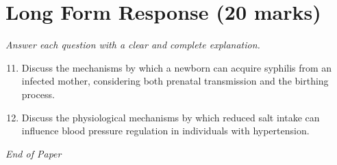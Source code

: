 \documentclass[12pt]{article}
\begin{document}
\section*{Long Form Response (20 marks)}
\textit{Answer each question with a clear and complete explanation.}
\begin{enumerate}[label=\arabic*.]
\setcounter{enumi}{10}
\item Discuss the mechanisms by which a newborn can acquire syphilis from an infected mother, considering both prenatal transmission and the birthing process.
\item Discuss the physiological mechanisms by which reduced salt intake can influence blood pressure regulation in individuals with hypertension.
\end{enumerate}

\vfill
\noindent\textit{End of Paper}
\end{document}
